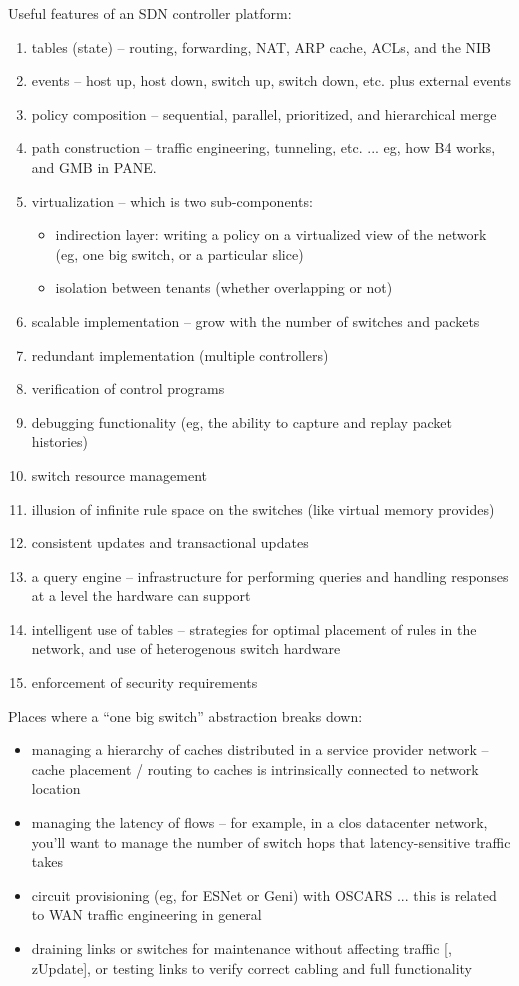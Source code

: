 Useful features of an SDN controller platform:
\begin{enumerate}
\item tables (state) -- routing, forwarding, NAT, ARP cache, ACLs, and the NIB
\item events -- host up, host down, switch up, switch down, etc. plus external events
\item policy composition -- sequential, parallel, prioritized, and hierarchical merge
\item path construction -- traffic engineering, tunneling, etc. ... eg, how B4 works, and GMB in PANE.
\item virtualization -- which is two sub-components:
	\begin{itemize}
	\item indirection layer: writing a policy on a virtualized view of the network (eg, one big switch, or a particular slice)
	\item isolation between tenants (whether overlapping or not)
	\end{itemize}
\item scalable implementation -- grow with the number of switches and packets
\item redundant implementation (multiple controllers)
\item verification of control programs
\item debugging functionality (eg, the ability to capture and replay packet histories)
\item switch resource management
\item illusion of infinite rule space on the switches  (like virtual memory provides)
\item consistent updates and transactional updates
\item a query engine -- infrastructure for performing queries and handling responses at a level the hardware can support
\item intelligent use of tables -- strategies for optimal placement of rules in the network, and use of heterogenous switch hardware
\item enforcement of security requirements
\end{enumerate}

Places where a ``one big switch'' abstraction breaks down:
\begin{itemize}
\item managing a hierarchy of caches distributed in a service provider network -- cache placement / routing to caches  is intrinsically connected to network location
\item managing the latency of flows -- for example, in a clos datacenter network, you'll want to manage the number of switch hops that latency-sensitive traffic takes
\item circuit provisioning (eg, for ESNet or Geni) with OSCARS ... this is related to WAN traffic engineering in general
\item draining links or switches for maintenance without affecting traffic [\eg, zUpdate], or testing links to verify correct cabling and full functionality
\end{itemize}

